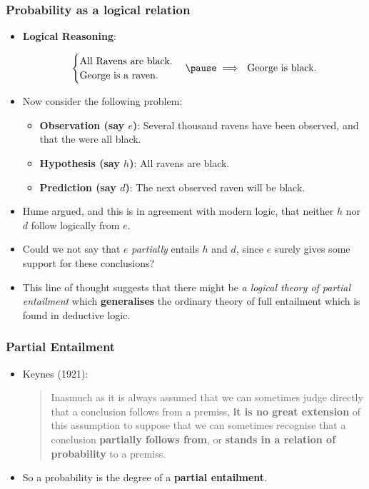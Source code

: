 \documentclass[usenames,dvipsnames, 10pt]{beamer}
\begin{document}
\begin{frame}
	\frametitle{Probability as a logical relation}
	\begin{itemize}
		\item \textbf{Logical Reasoning}:
		
		\begin{equation*}
			\begin{cases}
			\text{All Ravens are black.}\\
			\text{George is a raven.}			
			\end{cases}			
			\pause
			\implies
			\text{ George is black.}
		\end{equation*}
		
		\pause
		\item Now consider the following problem:
		
		\begin{itemize}
			\item \textbf{Observation (say $e$)}: Several thousand ravens have been observed, and that the were all black.
			
			\item \textbf{Hypothesis (say $h$)}: All ravens are black.
			
			\item \textbf{Prediction (say $d$)}: The next observed raven will be	black.
			
		\end{itemize}
		\pause		
		\item Hume argued, and this is in agreement with modern logic, that neither $h$ nor
		$d$ follow logically from $e$. 
		
		\pause
		\item 
		Could we not say that $e$ \emph{partially} entails $h$ and $d$, since $e$ surely gives some support for these
		conclusions?
		
		\pause
		\item This line of thought suggests that there might be \emph{a logical theory of
		partial entailment} which \textbf{generalises} the ordinary theory of full entailment which is found in deductive logic.
	
	\end{itemize}
\end{frame}


\begin{frame}
	\frametitle{Partial Entailment}
	\begin{itemize}
		\item Keynes (1921):
		
			\begin{quote}
				Inasmuch as it is always assumed that we can sometimes judge directly that
				a conclusion follows from a premiss, \textbf{it is no great extension} of this assumption
				to suppose that we can sometimes recognise that a conclusion \textbf{partially follows
				from}, or \textbf{stands in a relation of probability} to a premiss.
			\end{quote}
		\pause
		\item So a probability is the degree of a \textbf{partial entailment}.
	\end{itemize}
\end{frame}
\end{document}
